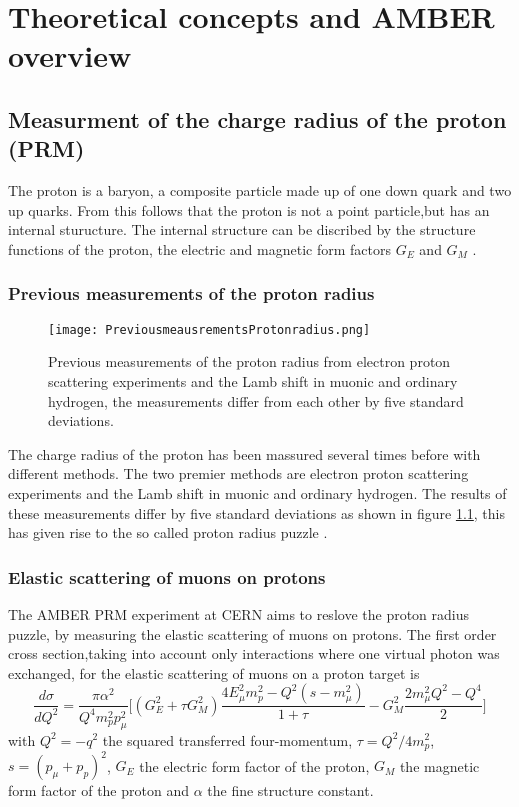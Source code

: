 \chapter{Theoretical concepts and AMBER overview}\label{cha:theory}


\section{Measurment of the charge radius of the proton (PRM)}\label{sec:proton_radius}
The proton is a baryon, a composite particle made up of one down quark and  two up quarks.
From this follows that the proton is not a point particle,but has an internal sturucture.
\newline
The internal structure can be discribed by the structure functions of the proton, 
the electric and magnetic form factors $G_E$ and $G_M$ \autocite{ProposalAmber}.	
\subsection{Previous measurements of the proton radius}
\begin{figure}[h]
	\centering
	\texttt{[image: PreviousmeausrementsProtonradius.png]}
	\caption{Previous measurements of the proton radius from electron proton  scattering experiments and the Lamb shift in muonic and ordinary hydrogen,
	 the measurements differ from each other by five standard deviations. \autocite{ProposalAmber} }
	\label{fig:previous_proton_radius}
\end{figure}

The charge radius of the proton has been massured several times before with different methods.
The two premier methods are electron proton scattering experiments and the Lamb shift in muonic and ordinary hydrogen.
The results of these measurements differ by five standard deviations as shown in figure \ref{fig:previous_proton_radius},
this has given rise to the so called proton radius puzzle \autocite{ProposalAmber}.

\subsection{Elastic scattering of muons on protons}
The AMBER PRM experiment at CERN aims to reslove the proton radius puzzle, by measuring the elastic scattering of muons on protons.
The first order cross section,taking into account only interactions where one virtual photon was exchanged, 
for the elastic scattering of muons on a proton target is \autocite{intentAmber}
\begin{equation}
\label{eq:cross_section}
\frac{d\sigma}{dQ^2} = \frac{\pi \alpha^2}{Q^4 m_p^2 p_\mu^2} \bigg[ \left( G_E^2 + \tau G_M^2 \right) \frac{ 4E_\mu^2 m_p^2 
- Q^2 (s - m_\mu^2)}{1 + \tau }  - G_M^2 \frac{ 2m_\mu^2 Q^2 - Q^4}{2} \bigg]
\end{equation}
with  $Q^2 = -q^2$ 	the squared transferred four-momentum, $\tau = Q^2 / 4m_p^2$, $s = (p_\mu + p_p)^2$, 
 $G_E$ the electric form factor of the proton,
  $G_M$ the magnetic form factor of the proton and $\alpha$ the fine structure constant.
  
